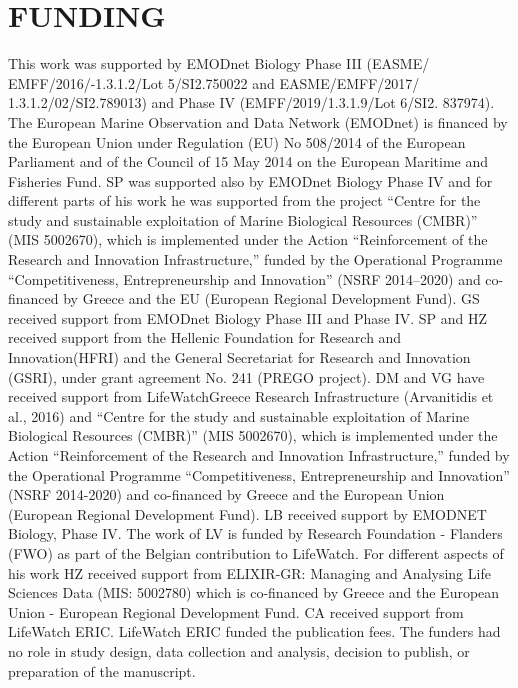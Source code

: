 \section{FUNDING}
This work was supported by EMODnet Biology Phase III (EASME/ EMFF/2016/-1.3.1.2/Lot 5/SI2.750022 and EASME/EMFF/2017/ 1.3.1.2/02/SI2.789013) and Phase IV (EMFF/2019/1.3.1.9/Lot 6/SI2. 837974). The European Marine Observation and Data Network (EMODnet) is financed by the European Union under Regulation (EU) No 508/2014 of the European Parliament and of the Council of 15 May 2014 on the European Maritime and Fisheries Fund. SP was supported also by EMODnet Biology Phase IV and for different parts of his work he was supported from the project “Centre for the study and sustainable exploitation of Marine Biological Resources (CMBR)” (MIS 5002670), which is implemented under the Action “Reinforcement of the Research and Innovation Infrastructure,” funded by the Operational Programme “Competitiveness, Entrepreneurship and Innovation” (NSRF 2014–2020) and co-financed by Greece and the EU (European Regional Development Fund). GS received support from EMODnet Biology Phase III and Phase IV. SP and HZ received support from the Hellenic Foundation for Research and Innovation(HFRI) and the General Secretariat for Research and Innovation (GSRI), under grant agreement No. 241 (PREGO project). DM and VG have received support from LifeWatchGreece Research Infrastructure (Arvanitidis et al., 2016) and “Centre for the study and sustainable exploitation of Marine Biological Resources (CMBR)” (MIS 5002670), which is implemented under the Action “Reinforcement of the Research and Innovation Infrastructure,” funded by the Operational Programme “Competitiveness, Entrepreneurship and Innovation” (NSRF 2014-2020) and co-financed by Greece and the European Union (European Regional Development Fund). LB received support by EMODNET Biology, Phase IV. The work of LV is funded by Research Foundation - Flanders (FWO) as part of the Belgian contribution to LifeWatch. For different aspects of his work HZ received support from ELIXIR-GR: Managing and Analysing Life Sciences Data (MIS: 5002780) which is co-financed by Greece and the European Union - European Regional Development Fund. CA received support from LifeWatch ERIC. LifeWatch ERIC funded the publication fees. The funders had no role in study design, data collection and analysis, decision to publish, or preparation of the manuscript.


